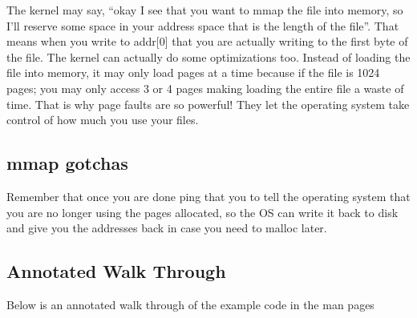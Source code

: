 The kernel may say, ``okay I see that you want to mmap the file into memory, so I'll reserve some space in your address space that is the length of the file''. That means when you write to addr{[}0{]} that you are actually writing to the first byte of the file. The kernel can actually do some optimizations too. Instead of loading the file into memory, it may only load pages at a time because if the file is 1024 pages; you may only access 3 or 4 pages making loading the entire file a waste of time. That is why page faults are so powerful! They let the operating system take control of how much you use your files.

\subsection{mmap gotchas}

 Remember that once you are done ping that you  to tell the operating system that you are no longer using the pages allocated, so the OS can write it back to disk and give you the addresses back in case you need to malloc later.

 \subsection{Annotated Walk Through}

 Below is an annotated walk through of the example code in the man pages

